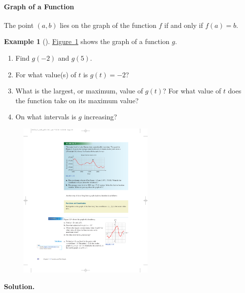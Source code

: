 \documentclass[10pt,]{book}
\theoremstyle{plain}
\theoremstyle{definition}
\theoremstyle{definition}
\newtheorem{example}[theorem]{Example}
\begin{document}
\paragraph[Graph of a Function]{Graph of a Function}\label{paragraphs-1}
The point \((a, b)\) lies on the graph of the function \(f\) if and only if \(f(a)=b\).
%
\begin{example}[]\label{example-function-graph}
\hyperref[fig-function]{Figure~\ref{fig-function}} shows the graph of a function \(g\).
    \leavevmode%
\begin{enumerate}[label=*\alph**]
\item\hypertarget{li-5}{}Find \(g(−2)\) and \(g(5)\).\item\hypertarget{li-6}{}For what value(s) of \(t\) is \(g(t) = −2\)?\item\hypertarget{li-7}{}What is the largest, or maximum, value of \(g(t)\)? For what value of \(t\) does the function take on its maximum value?\item\hypertarget{li-8}{}On what intervals is \(g\) increasing?\end{enumerate}
%
\leavevmode%
\begin{figure}
\centering
\includegraphics[width=0.60\textwidth,]{images/fig-function.pdf}\caption{\label{fig-function}}
\end{figure}
\par\medskip\noindent%
\textbf{Solution.}\quad \leavevmode%
\begin{enumerate}[label=*\alph**]

\end{enumerate}
\end{example}
\end{document}
